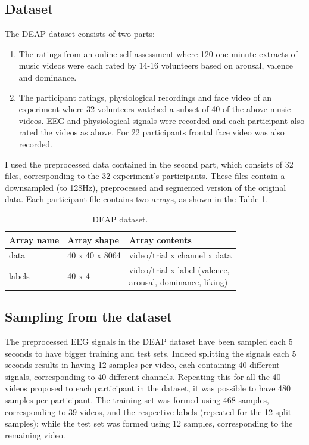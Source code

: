\documentclass[10pt,journal,A4paper,compsoc,epsfig]{IEEEtran}
\begin{document}
\subsection{Dataset}
The DEAP dataset consists of two parts:
\begin{enumerate}
\item The ratings from an online self-assessment where 120 one-minute extracts of music videos were each rated by 14-16 volunteers based on arousal, valence and dominance.
\item The participant ratings, physiological recordings and face video of an experiment where 32 volunteers watched a subset of 40 of the above music videos. EEG and physiological signals were recorded and each participant also rated the videos as above. For 22 participants frontal face video was also recorded.
\end{enumerate}

I used the preprocessed data contained in the second part, which consists of 32 files, corresponding to the 32 experiment's participants. These files contain a downsampled (to 128Hz), preprocessed and segmented version of the original data.
Each participant file contains two arrays, as shown in the Table \ref{table_dataset}.


\begin{table}
\centering
\begin{tabular}{l l l}
Array name & Array shape & Array contents \\
\hline
\noalign{\medskip}
data & 40 x 40 x 8064 & video/trial x channel x data \\
\noalign{\medskip}
labels & 40 x 4 & \parbox[t]{4cm}{video/trial x label (valence, \\ arousal, dominance, liking)} \\
\noalign{\smallskip}
\hline
\end{tabular}
\caption{DEAP dataset.}
\label{table_dataset}
\end{table}%


\subsection{Sampling from the dataset}
The preprocessed EEG signals in the DEAP dataset have been sampled each 5 seconds to have bigger training and test sets. Indeed splitting the signals each 5 seconds results in having 12 samples per video, each containing 40 different signals, corresponding to 40 different channels. Repeating this for all the 40 videos proposed to each participant in the dataset, it was possible to have 480 samples per participant. The training set was formed using 468 samples, corresponding to 39 videos, and the respective labels (repeated for the 12 split samples); while the test set was formed using 12 samples, corresponding to the remaining video.
\end{document}
